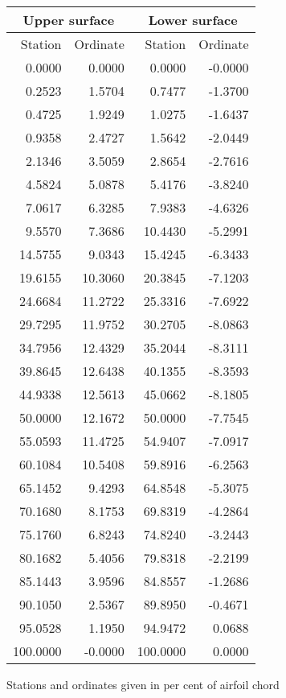 \documentclass[11pt]{book}
\begin{document}
 \hspace{4mm}
 \begin{tabular}{|r|r|r|r|} \hline 
 \multicolumn{2}{|c|}{Upper surface} & \multicolumn{2}{|c|}{Lower surface} \\
 \hline
 Station & Ordinate & Station & Ordinate \\
 \hline
0.0000 & 0.0000 & 0.0000 & -0.0000 \\
0.2523 & 1.5704 & 0.7477 & -1.3700 \\
0.4725 & 1.9249 & 1.0275 & -1.6437 \\
0.9358 & 2.4727 & 1.5642 & -2.0449 \\
2.1346 & 3.5059 & 2.8654 & -2.7616 \\
4.5824 & 5.0878 & 5.4176 & -3.8240 \\
7.0617 & 6.3285 & 7.9383 & -4.6326 \\
9.5570 & 7.3686 & 10.4430 & -5.2991 \\
14.5755 & 9.0343 & 15.4245 & -6.3433 \\
19.6155 & 10.3060 & 20.3845 & -7.1203 \\
24.6684 & 11.2722 & 25.3316 & -7.6922 \\
29.7295 & 11.9752 & 30.2705 & -8.0863 \\
34.7956 & 12.4329 & 35.2044 & -8.3111 \\
39.8645 & 12.6438 & 40.1355 & -8.3593 \\
44.9338 & 12.5613 & 45.0662 & -8.1805 \\
50.0000 & 12.1672 & 50.0000 & -7.7545 \\
55.0593 & 11.4725 & 54.9407 & -7.0917 \\
60.1084 & 10.5408 & 59.8916 & -6.2563 \\
65.1452 & 9.4293 & 64.8548 & -5.3075 \\
70.1680 & 8.1753 & 69.8319 & -4.2864 \\
75.1760 & 6.8243 & 74.8240 & -3.2443 \\
80.1682 & 5.4056 & 79.8318 & -2.2199 \\
85.1443 & 3.9596 & 84.8557 & -1.2686 \\
90.1050 & 2.5367 & 89.8950 & -0.4671 \\
95.0528 & 1.1950 & 94.9472 & 0.0688 \\
100.0000 & -0.0000 & 100.0000 & 0.0000 \\
 \hline 
 \end{tabular}
 \vspace{8mm}

Stations and ordinates given in per cent of airfoil chord
\end{document}
